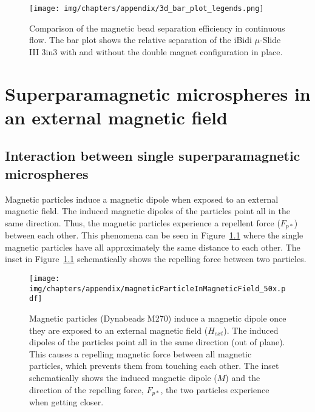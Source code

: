 \begin{figure}[htb]
	\centering
	\texttt{[image: img/chapters/appendix/3d\_bar\_plot\_legends.png]}
	\label{fig:continuousSeparationEfficiency}
	\caption[Comparison of the magnetic bead separation efficiency in continuous flow with and without the double magnet configuration]{Comparison of the magnetic bead separation efficiency in continuous flow. The bar plot shows the relative separation of the iBidi $\mu$-Slide III 3in3 with and without the double magnet configuration in place.}
\end{figure}

\cleardoublepage

\chapter{Superparamagnetic microspheres in an external magnetic field}\label{sec:superparamagneticMicrospheresInAnExternalMagneticField}

\section{Interaction between single superparamagnetic microspheres}
Magnetic particles induce a magnetic dipole when exposed to an external magnetic field. The induced magnetic dipoles of the particles point all in the same direction. Thus, the magnetic particles experience a repellent force ($F_{p\ast}$) between each other. This phenomena can be seen in Figure~\ref{fig:interactionBetweenSingleSuperparamagneticMicrospheres} where the single magnetic particles have all approximately the same distance to each other. The inset in Figure~\ref{fig:interactionBetweenSingleSuperparamagneticMicrospheres} schematically shows the repelling force between two particles. 

\begin{figure}[htb]
	\centering
	\texttt{[image: img/chapters/appendix/magneticParticleInMagneticField\_50x.pdf]}
	\label{fig:interactionBetweenSingleSuperparamagneticMicrospheres}
	\caption[Repellent force between individual dipoles]{Magnetic particles (Dynabeads M270) induce a magnetic dipole once they are exposed to an external magnetic field ($H_{ext}$). The induced dipoles of the particles point all in the same direction (out of plane). This causes a repelling magnetic force between all magnetic particles, which prevents them from touching each other. The inset schematically shows the induced magnetic dipole ($M$) and the direction of the repelling force, $F_{p\ast}$, the two particles experience when getting closer.}
\end{figure}

